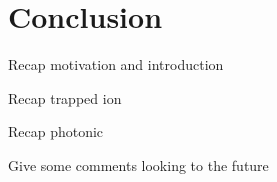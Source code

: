 \section{Conclusion}

Recap motivation and introduction

Recap trapped ion

Recap photonic

Give some comments looking to the future